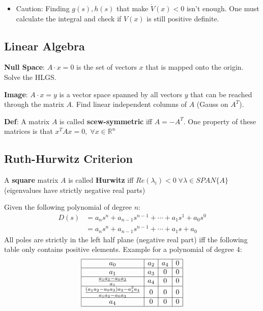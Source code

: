 \newpar{}
\begin{itemize}
    \item Caution: Finding $g(s), h(s)$ that make $\dot{V}(x)<0$ isn't enough. One must calculate the integral and check if $V(x)$ is still positive definite.
\end{itemize}

\subsection{Linear Algebra}
\textbf{Null Space}: $A\cdot x = 0$ is the set of vectors $x$ that is mapped onto the origin. Solve the HLGS.

\textbf{Image}: $A \cdot x = y$ is a vector space spanned by all vectors $y$ that can be reached through the matrix $A$. Find linear independent columns of $A$ (Gauss on $A^T$).

\textbf{Def}: A matrix $A$ is called \textbf{scew-symmetric} iff $A = -A^T$. One property of these matrices is that $x^T A x = 0, \; \forall x\in \mathbb{R}^n$

\subsection{Ruth-Hurwitz Criterion}
A \textbf{square} matrix $A$ is called \textbf{Hurwitz} iff $Re(\lambda_i) < 0 \; \forall \lambda \in SPAN\{ A \}$ (eigenvalues have strictly negative real parts)

Given the following polynomial of degree $n$:
\begin{align*}
    D(s) & = a_n s^n + a_{n-1}s^{n-1} + \cdots + a_1s^1 + a_0s^0 \\
         & = a_n s^n + a_{n-1}s^{n-1} + \cdots + a_1s + a_0
\end{align*}
All poles are strictly in the left half plane (negative real part) iff the following table only contains positive elements. Example for a polynomial of degree 4:
\begin{align*}
    \begin{array}{|c|c|c|c|}
        \hline
        a_0                                                         & a_2 & a_4 & 0 \\
        \hline
        a_1                                                         & a_3 & 0   & 0 \\
        \hline
        \frac{a_1 a_2 - a_0 a_3}{a_1}                               & a_4 & 0   & 0 \\
        \hline
        \frac{(a_1 a_2 - a_0 a_3)a_3 - a_1^2a_4}{a_1 a_2 - a_0 a_3} & 0   & 0   & 0 \\
        \hline
        a_4                                                         & 0   & 0   & 0 \\
        \hline
    \end{array}
\end{align*}

